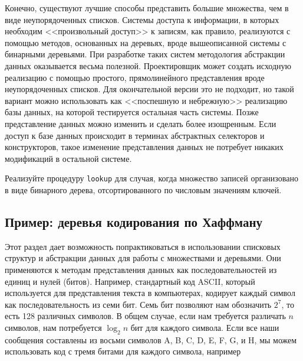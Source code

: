 Конечно, существуют лучшие способы представить большие 
множества, чем в виде неупорядоченных списков.  Системы доступа к
информации, в которых необходим <<произвольный доступ>> к записям, как 
правило, реализуются с помощью методов, основанных на деревьях, вроде
вышеописанной системы с бинарными деревьями.  При разработке таких
систем методология абстракции данных оказывается весьма
полезной.  Проектировщик может создать исходную реализацию с помощью
простого, прямолинейного представления вроде неупорядоченных списков.
Для окончательной версии это не подходит, но такой вариант можно
использовать как <<поспешную и небрежную>> реализацию базы данных, на
которой  тестируется остальная часть системы.  Позже
представление данных можно изменить и сделать более изощренным.  Если
доступ к базе данных происходит в терминах абстрактных селекторов и
конструкторов, такое изменение представления данных не потребует
никаких модификаций в остальной системе.
\begin{exercise}{2.66}\label{EX2.66}%
Реализуйте процедуру {\tt lookup} для случая,
когда множество записей организовано в виде бинарного дерева,
отсортированного по числовым значениям ключей.
\end{exercise}

\subsection{Пример: деревья кодирования по Хаффману}
\label{EXAMPLE-HUFFMAN-ENCODING-TREES}


Этот раздел дает возможность попрактиковаться в использовании
списковых структур и абстракции данных для работы с множествами и
деревьями. Они применяются к методам представления данных как
последовательностей из единиц и нулей (битов).  Например, стандартный
код ASCII, который используется для
представления текста в 
компьютерах, кодирует каждый символ как последовательность из семи
бит. Семь бит позволяют нам обозначить $2^7$, то есть 128
различных символов.  В общем случае, если нам требуется различать
$n$ символов, нам потребуется $\log_2 n$ бит
для каждого символа.  Если все наши сообщения составлены из восьми
символов A, B, C, D, E, F, G, и H, мы можем использовать код с тремя
битами для каждого символа, например

